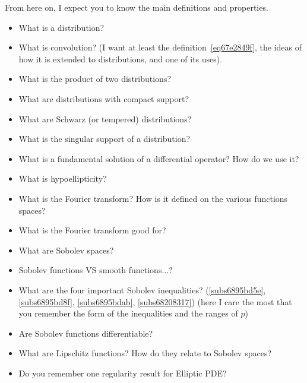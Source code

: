 \documentclass[a4paper,9pt]{amsart}
\theoremstyle{plain}
\theoremstyle{definition}
\theoremstyle{remark}
\begin{document}
From here on, I expect you to know the main definitions and properties.

\begin{itemize}
\item
What is a distribution?
\item
What is convolution? (I want at least the definition~\eqref{eq67e2849f}, the ideas of how it is extended to distributions, and one of its uses).
\item
What is the product of two distributions?
\item
What are distributions with compact support? 
\item
What are Schwarz (or tempered) distributions?
\item
What is the singular support of a distribution?
\item
What is a fundamental solution of a differential operator? How do we use it?
\item
What is hypoellipticity?
\item
What is the Fourier transform? How is it defined on the various functions spaces?
\item
What is the Fourier transform good for?
\item
What are Sobolev spaces?
\item
Sobolev functions VS smooth functions...?
\item
What are the four important Sobolev inequalities? (\ref{subs6895bd5e}, \ref{subs6895bd8f}, \ref{subs6895bdab}, \ref{subs68208317}) (here I care the most that you remember the form of the inequalities and the ranges of $p$)
\item
Are Sobolev functions differentiable?
\item
What are Lipschitz functions? How do they relate to Sobolev spaces?
\item
Do you remember one regularity result for Elliptic PDE? 
\end{itemize}


\end{document}
